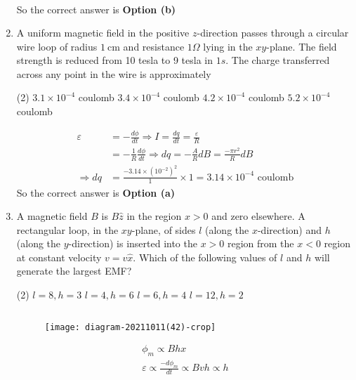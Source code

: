 \begin{enumerate}
\begin{answer}
\begin{align*}
	\end{align*}
	So the correct answer is \textbf{Option (b)}
\end{answer}
	\item A uniform magnetic field in the positive $z$-direction passes through a circular wire loop of radius $1 \mathrm{~cm}$ and resistance $1 \Omega$ lying in the $x y$-plane. The field strength is reduced from 10 tesla to 9 tesla in $1 s$. The charge transferred across any point in the wire is approximately
	{}
	\begin{tasks}(2)
		\task[\textbf{a.}] $3.1 \times 10^{-4}$ coulomb
		\task[\textbf{b.}]$3.4 \times 10^{-4}$ coulomb
		\task[\textbf{c.}]$4.2 \times 10^{-4}$ coulomb
		\task[\textbf{d.}] $5.2 \times 10^{-4}$ coulomb
	\end{tasks}	
\begin{answer}
	\begin{align*}
	\varepsilon&=-\frac{d \phi}{d t} \Rightarrow I=\frac{d q}{d t}=\frac{\varepsilon}{R}\\&=-\frac{1}{R} \frac{d \phi}{d t} \Rightarrow d q=-\frac{A}{R} d B=\frac{-\pi r^{2}}{R} d B\\
	\Rightarrow d q&=\frac{-3.14 \times\left(10^{-2}\right)^{2}}{1} \times 1=3.14 \times 10^{-4}\text{ coulomb}
	\end{align*}
	So the correct answer is \textbf{Option (a)}
\end{answer}
	\item A magnetic field $B$ is $B \hat{z}$ in the region $x>0$ and zero elsewhere. A rectangular loop, in the $x y$-plane, of sides $l$ (along the $x$-direction) and $h$ (along the $y$-direction) is inserted into the $x>0$ region from the $x<0$ region at constant velocity $v=v \hat{x}$. Which of the following values of $l$ and $h$ will generate the largest EMF?
	{}
	\begin{tasks}(2)
		\task[\textbf{a.}] $l=8, h=3$
		\task[\textbf{b.}]$l=4, h=6$
		\task[\textbf{c.}]$l=6, h=4$
		\task[\textbf{d.}]  $l=12, h=2$
	\end{tasks}	
\begin{answer}$\left. \right. $
	\begin{figure}[H]
		\centering
		\texttt{[image: diagram-20211011(42)-crop]}
	\end{figure}
	\begin{align*}
	\phi_{m} \propto B h x\\
	\varepsilon \propto \frac{-d \phi_{m}}{d t} \propto B v h \propto h

\end{align*}
\end{answer}
\end{enumerate}
